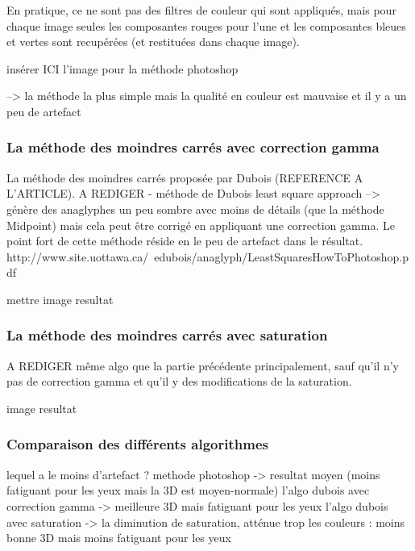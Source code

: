 	En pratique, ce ne sont pas des filtres de couleur qui sont appliqués, mais pour chaque image seules les composantes rouges pour l'une et les composantes bleues et vertes sont recupérées (et restituées dans chaque image).
	
	 insérer ICI l'image pour la méthode photoshop

	--> la méthode la plus simple mais la qualité en couleur est mauvaise et il y a un peu de artefact
\subsubsection{La méthode des moindres carrés avec correction gamma}

	La méthode des moindres carrés proposée par Dubois (REFERENCE A L'ARTICLE).
A REDIGER
- méthode de Dubois least square approach
--> génère des anaglyphes un peu sombre avec moins de détails (que la méthode Midpoint) mais cela peut être corrigé en appliquant une correction gamma. Le point fort de cette méthode réside en le peu de artefact dans le résultat.
http://www.site.uottawa.ca/~edubois/anaglyph/LeastSquaresHowToPhotoshop.pdf

mettre image resultat

\subsubsection{La méthode des moindres carrés avec saturation}
A REDIGER
même algo que la partie précédente principalement, sauf qu'il n'y pas de correction gamma et qu'il y des modifications de la saturation.

image resultat

\subsubsection{Comparaison des différents algorithmes}

lequel a le moins d'artefact ?
methode photoshop -> resultat moyen (moins fatiguant pour les yeux mais la 3D est moyen-normale)
l'algo dubois avec correction gamma -> meilleure 3D mais fatiguant pour les yeux
l'algo dubois avec saturation -> la diminution de saturation, atténue trop les couleurs : moins bonne 3D mais moins fatiguant pour les yeux 




